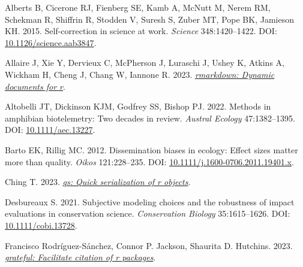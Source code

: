 \documentclass[10pt,a4paper]{article}
\newlength{\cslhangindent}
\newlength{\cslentryspacingunit} %
\newenvironment{CSLReferences}[2] %
 {%
  \setlength{\parindent}{0pt}
  \ifodd #1
  \let\oldpar\par
  \def\par{\hangindent=\cslhangindent\oldpar}
  \fi
  \setlength{\parskip}{#2\cslentryspacingunit}
 }%
 {}
\begin{document}
\hypertarget{refs}{}
\begin{CSLReferences}{1}{0}
\leavevmode{}%
Alberts B, Cicerone RJ, Fienberg SE, Kamb A, McNutt M, Nerem RM, Schekman R, Shiffrin R, Stodden V, Suresh S, Zuber MT, Pope BK, Jamieson KH. 2015. Self-correction in science at work. \emph{Science} 348:1420--1422. DOI: \href{https://doi.org/10.1126/science.aab3847}{10.1126/science.aab3847}.

\leavevmode{}%
Allaire J, Xie Y, Dervieux C, McPherson J, Luraschi J, Ushey K, Atkins A, Wickham H, Cheng J, Chang W, Iannone R. 2023. \emph{\href{https://github.com/rstudio/rmarkdown}{{rmarkdown}: Dynamic documents for r}}.

\leavevmode{}%
Altobelli JT, Dickinson KJM, Godfrey SS, Bishop PJ. 2022. Methods in amphibian biotelemetry: {Two} decades in review. \emph{Austral Ecology} 47:1382--1395. DOI: \href{https://doi.org/10.1111/aec.13227}{10.1111/aec.13227}.

\leavevmode{}%
Barto EK, Rillig MC. 2012. Dissemination biases in ecology: Effect sizes matter more than quality. \emph{Oikos} 121:228--235. DOI: \href{https://doi.org/10.1111/j.1600-0706.2011.19401.x}{10.1111/j.1600-0706.2011.19401.x}.

\leavevmode{}%
Ching T. 2023. \emph{\href{https://CRAN.R-project.org/package=qs}{{qs}: Quick serialization of r objects}}.

\leavevmode{}%
Desbureaux S. 2021. Subjective modeling choices and the robustness of impact evaluations in conservation science. \emph{Conservation Biology} 35:1615--1626. DOI: \href{https://doi.org/10.1111/cobi.13728}{10.1111/cobi.13728}.

\leavevmode{}%
Francisco Rodríguez-Sánchez, Connor P. Jackson, Shaurita D. Hutchins. 2023. \emph{\href{https://github.com/Pakillo/grateful}{{grateful}: Facilitate citation of r packages}}.


\end{CSLReferences}
\end{document}
